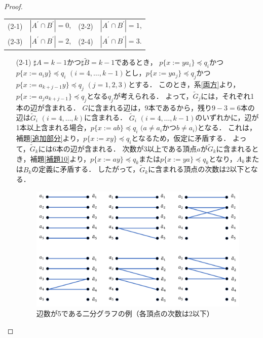 \begin{proof}
\begin{enumerate}
\begin{tabular}{llll}
\textrm{(2-1)} & $| A^{\prime} \cap B^{\prime} | = 0$,&\textrm{(2-2)} & $| A^{\prime} \cap B^{\prime} | = 1$,\\
\textrm{(2-3)} & $| A^{\prime} \cap B^{\prime} | = 2$,&\textrm{(2-4)} & $| A^{\prime} \cap B^{\prime} | = 3$.
\end{tabular}

\begin{enumerate}
\item[\textrm{(2-1)}] 
$\sharp A=k-1$かつ$\sharp \tilde{B}=k-1$であるとき，
$p \{ x:=ya_{i} \} \preceq q_{i}$かつ$p \{ x:=a_{i}y \} \preceq q_{i}$ $(i=4, \ldots, k-1)$とし，$p \{ x:=ya_{j} \} \preceq q_{j}$かつ$p \{ x:=a_{k+j-1}y \} \preceq q_{j}$ $(j=1,2,3)$とする．
このとき，系\ref{両方}より，$p \{ x:=a_{j}a_{k+j-1} \} \preceq q_{j}$となる$q_{j}$が考えられる．
よって，$\tilde{G}_{j}$には，それぞれ1本の辺が含まれる．
$G$に含まれる辺は，9本であるから，残り$9-3=6$本の辺は$\tilde{G}_{i}$ $(i=4, \ldots, k)$に含まれる．
$\tilde{G}_{i}$ $(i=4, \ldots, k-1)$のいずれかに，辺が1本以上含まれる場合，$p \{ x:=ab \} \preceq q_{i}$ $(a \not = a_{i}$かつ$b \not = a_{i})$となる．
これは，補題\ref{追加部分}より，$p \{ x:=xy \} \preceq q_{i}$となるため，仮定に矛盾する．
よって，$\tilde{G}_{k}$には$6$本の辺が含まれる．
次数が3以上である頂点$a$が$\tilde{G}_{k}$に含まれるとき，補題\ref{補題10}より，$p \{x:=ay \} \preceq q_{k}$または$p \{ x:= ya \} \preceq q_{k}$となり，$A_{k}$または$B_{k}$の定義に矛盾する．
したがって，$\tilde{G}_{k}$に含まれる頂点の次数は2以下となる．

\begin{figure}[t]
\centering
\includegraphics[width=\linewidth]{figs/Exam-BipartiteGraph.png}
\caption{辺数が5である二分グラフの例（各頂点の次数は2以下）}
\label{辺5本の場合}
\end{figure}


\end{enumerate}
\end{enumerate}
\end{proof}
